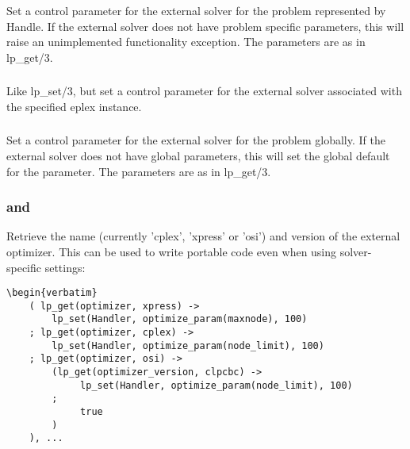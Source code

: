 \subsubsection{}
Set a control parameter for the external solver for the problem represented
by Handle. If the external solver does not have problem specific
parameters, this will raise an unimplemented functionality exception. 
The parameters are as in lp_get/3.

\subsubsection{}
Like lp_set/3, but set a control parameter for the external solver
associated with the specified eplex instance. 

\subsubsection{}
Set a control parameter for the external solver for the problem globally.
If the external solver does not have global parameters, this will set the
global default for the parameter. The parameters are as in lp_get/3.

\subsubsection{
and }
Retrieve the name (currently 'cplex', 'xpress' or 'osi') and version of the 
external optimizer.
This can be used to write portable code even when using solver-specific settings:
\begin{verbatim}
\begin{verbatim}
    ( lp_get(optimizer, xpress) ->
        lp_set(Handler, optimize_param(maxnode), 100)
    ; lp_get(optimizer, cplex) ->
        lp_set(Handler, optimize_param(node_limit), 100)
    ; lp_get(optimizer, osi) ->
        (lp_get(optimizer_version, clpcbc) -> 
             lp_set(Handler, optimize_param(node_limit), 100)
        ;
             true
        )
    ), ...
\end{verbatim}

